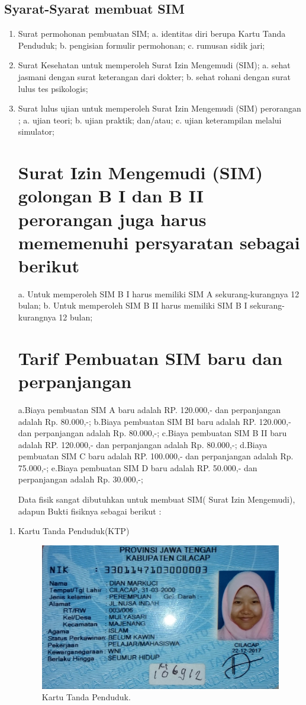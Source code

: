 \subsection{Syarat-Syarat membuat SIM}
\begin{enumerate}
\item Surat permohonan pembuatan SIM;
a. identitas diri berupa Kartu Tanda Penduduk;
b. pengisian formulir permohonan;
c. rumusan sidik jari;
\item Surat Kesehatan untuk memperoleh Surat Izin Mengemudi (SIM);
a. sehat jasmani dengan surat keterangan dari dokter;
b. sehat rohani dengan surat lulus tes psikologis;
\item Surat lulus ujian untuk memperoleh Surat Izin Mengemudi (SIM) perorangan ;
a. ujian teori;
b. ujian praktik; dan/atau;
c. ujian keterampilan melalui simulator;
\section{Surat Izin Mengemudi (SIM) golongan B I dan B II perorangan juga harus mememenuhi persyaratan sebagai berikut}
a. Untuk memperoleh SIM B I harus memiliki SIM A sekurang-kurangnya 12 bulan;
b. Untuk memperoleh SIM B II harus memiliki SIM B I sekurang-kurangnya 12 bulan;
\section{Tarif Pembuatan SIM baru dan perpanjangan}
a.Biaya pembuatan SIM A baru adalah RP. 120.000,- dan perpanjangan adalah Rp. 80.000,-;
b.Biaya pembuatan SIM BI baru adalah RP. 120.000,- dan perpanjangan adalah Rp. 80.000,-;
c.Biaya pembuatan SIM B II baru adalah RP. 120.000,- dan perpanjangan adalah Rp. 80.000,-;
d.Biaya pembuatan SIM C baru adalah RP. 100.000,- dan perpanjangan adalah Rp. 75.000,-;
e.Biaya pembuatan SIM D baru adalah RP. 50.000,- dan perpanjangan adalah Rp. 30.000,-;


Data fisik sangat dibutuhkan untuk membuat SIM(
Surat Izin Mengemudi), adapun Bukti fisiknya sebagai berikut :  
\end{enumerate}
\begin{enumerate}

	\item Kartu Tanda Penduduk(KTP)
	\begin{figure}[H]
		\centering
		\includegraphics[width=12cm]{figures/KTP.jpeg}
		\caption{Kartu Tanda Penduduk.}	
	\end{figure}

\end{enumerate}